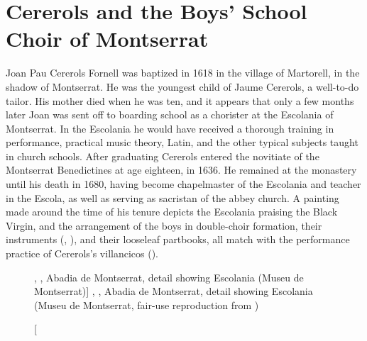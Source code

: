 
\section{Cererols and the Boys' School Choir of Montserrat}

Joan Pau Cererols Fornell was baptized in 1618 in the village of Martorell, in
the shadow of Montserrat.%
    \Autocite{Balanza:CererolsFamily}
He was the youngest child of Jaume Cererols, a well-to-do tailor.
His mother died when he was ten, and it appears that only a few months later
Joan was sent off to boarding school as a chorister at the Escolania of
Montserrat.
In the Escolania he would have received a thorough training in performance,
practical music theory, Latin, and the other typical subjects taught in church
schools.
After graduating Cererols entered the novitiate of the Montserrat Benedictines
at age eighteen, in 1636.
He remained at the monastery until his death in 1680, having become chapelmaster
of the Escolania and teacher in the Escola, as well as serving as sacristan of
the abbey church.
A painting made around the time of his tenure depicts the Escolania praising
the Black Virgin, and the arrangement of the boys in double-choir formation,
their instruments (, ), and their looseleaf
partbooks, all match with the performance practice of Cererols's villancicos
().%
    \Autocite[34]{Laplana:MontserratMuseu}


\begin{figure}
    \caption
    [, , Abadia de Montserrat,
    detail showing Escolania (Museu de Montserrat)]
    {, , Abadia de Montserrat,
    detail showing Escolania (Museu de Montserrat, fair-use reproduction from
    )}

    \label{fig:BMV-Montserrat}
\end{figure}

